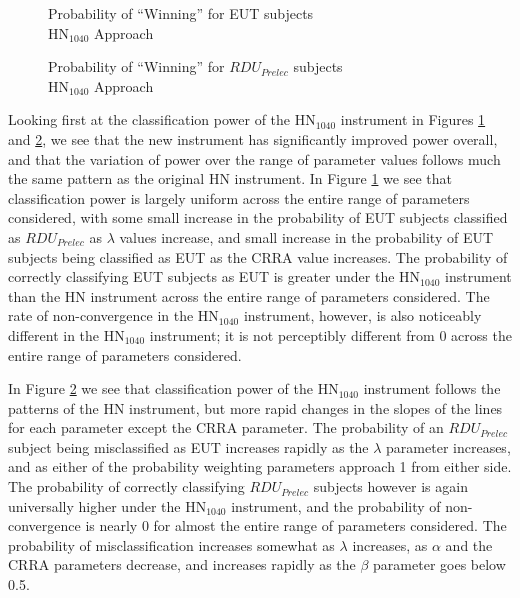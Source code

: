 \documentclass[../main.tex]{subfiles}
\begin{document}
\begin{figure}[h!]
	\center
	\caption{Probability of \enquote{Winning} for EUT subjects\\$\text{HN}_{1040}$ Approach}
	\label{fig:HN_win_eut}
\end{figure}

\begin{figure}[h!]
	\center
	\caption{Probability of \enquote{Winning} for $\mathit{RDU_{Prelec}}$ subjects\\$\text{HN}_{1040}$ Approach}
	\label{fig:HN_win_pre}
\end{figure}

Looking first at the classification power of the $\text{HN}_{1040}$ instrument in Figures \ref{fig:HN_win_eut} and \ref{fig:HN_win_pre}, we see that the new instrument has significantly improved power overall, and that the variation of power over the range of parameter values follows much the same pattern as the original HN instrument.
In Figure \ref{fig:HN_win_eut} we see that classification power is largely uniform across the entire range of parameters considered, with some small increase in the probability of EUT subjects classified as $\mathit{RDU_{Prelec}}$ as $\lambda$ values increase, and small increase in the probability of EUT subjects being classified as EUT as the CRRA value increases.
The probability of correctly classifying EUT subjects as EUT is greater under the $\text{HN}_{1040}$ instrument than the HN instrument across the entire range of parameters considered.
The rate of non-convergence in the $\text{HN}_{1040}$ instrument, however, is also noticeably different in the $\text{HN}_{1040}$ instrument; it is not perceptibly different from 0 across the entire range of parameters considered.

In Figure \ref{fig:HN_win_pre} we see that classification power of the $\text{HN}_{1040}$ instrument follows the patterns of the HN instrument, but more rapid changes in the slopes of the lines for each parameter except the CRRA parameter.
The probability of an $\mathit{RDU_{Prelec}}$ subject being misclassified as EUT increases rapidly as the $\lambda$ parameter increases, and as either of the probability weighting parameters approach 1 from either side.
The probability of correctly classifying $\mathit{RDU_{Prelec}}$ subjects however is again universally higher under the $\text{HN}_{1040}$ instrument, and the probability of non-convergence is nearly 0 for almost the entire range of parameters considered.
The probability of misclassification increases somewhat as $\lambda$ increases, as $\alpha$ and the CRRA parameters decrease, and increases rapidly as the $\beta$ parameter goes below 0.5.
\end{document}
